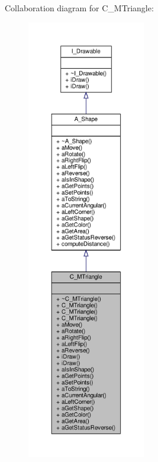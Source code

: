 Collaboration diagram for C\+\_\+\+M\+Triangle\+:
\nopagebreak
\begin{figure}[H]
\begin{center}
\leavevmode
\includegraphics[height=550pt]{classC__MTriangle__coll__graph}
\end{center}
\end{figure}
